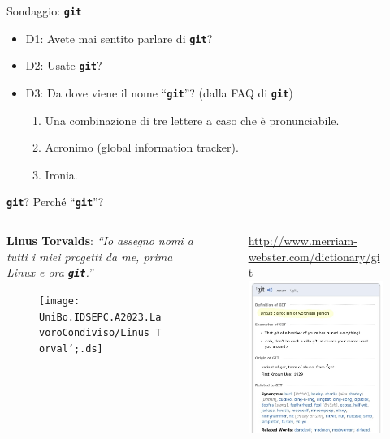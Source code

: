 \documentclass{beamer}
\newcommand{\git}{\texttt{\textbf{git}}\xspace}
\begin{document}
\begin{frame}{\centerline{Sondaggio: \git}}
  \begin{itemize}\setlength{\itemsep}{+3mm}
  \item D1: Avete mai sentito parlare di \git?
  \item D2: Usate \git?
  \item D3: Da dove viene il nome ``\git''? (dalla FAQ di \git)
    \begin{enumerate}\setlength{\itemsep}{+2mm}
    \item Una combinazione di tre lettere a caso che \`{e} pronunciabile.
    \item Acronimo (global information tracker).
    \item Ironia.
    \end{enumerate}
  \end{itemize}
\end{frame}

\begin{frame}{\centerline{\git? Perch\'{e} ``\git''?}}
  \begin{columns}
    \begin{column}{5cm}
      \textbf{Linus Torvalds}: 
        \emph{``Io assegno nomi a tutti i miei progetti da me, prima Linux e ora
        \git.}''
      \begin{figure}
        \centering
        \texttt{[image: UniBo.IDSEPC.A2023.LavoroCondiviso/Linus\_Torval';.ds]}
      \end{figure}
    \end{column}
    \begin{column}{7cm}
      \begin{figure}
        \url{http://www.merriam-webster.com/dictionary/git}
        \centering
        \includegraphics[width=5cm]{UniBo.IDSEPC.A2023.LavoroCondiviso/git-merriam}
      \end{figure}
    \end{column}
    \end{columns}
\end{frame}
\end{document}

